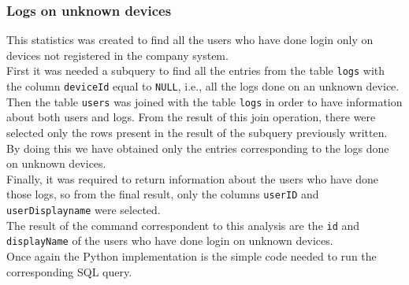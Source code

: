 \documentclass[12pt, a4paper, oneside]{article}
\begin{document}
\subsubsection{Logs on unknown devices}
This statistics was created to find all the users who have done login only on devices not registered in the company system.\\
First it was needed a subquery to find all the entries from the table \texttt{logs} with the column \texttt{deviceId} equal to \texttt{NULL}, i.e., all the logs done on an unknown device.\\
Then the table \texttt{users} was joined with the table \texttt{logs} in order to have information about both users and logs. From the result of this join operation, there were selected only the rows present
in the result of the subquery previously written. By doing this we have obtained only the entries corresponding to the logs done on unknown devices.\\
Finally, it was required to return information about the users who have done those logs, so from the final result, only the columns \texttt{userID} and \texttt{userDisplayname} were selected.\\
The result of the command correspondent to this analysis are the \texttt{id} and \texttt{displayName} of the users who have done login on unknown devices.\\
Once again the Python implementation is the simple code needed to run the corresponding SQL query.
\end{document}
